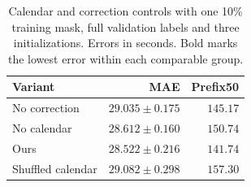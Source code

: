 \begin{table}[t]
\centering\footnotesize\setlength{\tabcolsep}{4pt}
\caption{Calendar and correction controls with one 10\% training mask, full validation labels and three initializations. Errors in seconds. Bold marks the lowest error within each comparable group.}\label{tab:mechanism}
\begin{tabular}{lrr}\toprule
Variant & MAE & Prefix50\\\midrule
No correction & $29.035\pm0.175$ & $145.17$\\
No calendar & $28.612\pm0.160$ & $150.74$\\
Ours & $\mathbf{28.522\pm0.216}$ & $\mathbf{141.74}$\\
Shuffled calendar & $29.082\pm0.298$ & $157.30$\\
\bottomrule\end{tabular}
\end{table}
